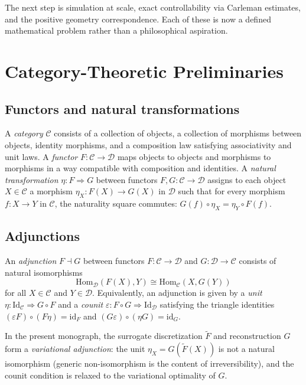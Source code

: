 \documentclass[12pt, oneside]{memoir}
\newcommand{\Ft}{\widetilde{F}}
\begin{document}
The next step is simulation at scale, exact controllability via Carleman estimates, and
the positive geometry correspondence.  Each of these is now a defined mathematical
problem rather than a philosophical aspiration.
\appendix

\chapter{Category-Theoretic Preliminaries}
\label{app:cat}

\section{Functors and natural transformations}

A \emph{category} $\mathcal{C}$ consists of a collection of objects, a collection of
morphisms between objects, identity morphisms, and a composition law satisfying
associativity and unit laws.  A \emph{functor} $F: \mathcal{C} \to \mathcal{D}$ maps
objects to objects and morphisms to morphisms in a way compatible with composition and
identities.  A \emph{natural transformation} $\eta: F \Rightarrow G$ between functors
$F, G: \mathcal{C} \to \mathcal{D}$ assigns to each object $X \in \mathcal{C}$ a
morphism $\eta_X: F(X) \to G(X)$ in $\mathcal{D}$ such that for every morphism
$f: X \to Y$ in $\mathcal{C}$, the naturality square commutes:
$G(f) \circ \eta_X = \eta_Y \circ F(f)$.

\section{Adjunctions}

An \emph{adjunction} $F \dashv G$ between functors $F: \mathcal{C} \to \mathcal{D}$ and
$G: \mathcal{D} \to \mathcal{C}$ consists of natural isomorphisms
\[
  \mathrm{Hom}_{\mathcal{D}}(F(X), Y) \cong \mathrm{Hom}_{\mathcal{C}}(X, G(Y))
\]
for all $X \in \mathcal{C}$ and $Y \in \mathcal{D}$.  Equivalently, an adjunction is
given by a \emph{unit} $\eta: \mathrm{Id}_\mathcal{C} \Rightarrow G \circ F$ and a
\emph{counit} $\varepsilon: F \circ G \Rightarrow \mathrm{Id}_\mathcal{D}$ satisfying
the triangle identities $(\varepsilon F) \circ (F\eta) = \mathrm{id}_F$ and
$(G\varepsilon) \circ (\eta G) = \mathrm{id}_G$.

In the present monograph, the surrogate discretization $\Ft$ and reconstruction $G$ form
a \emph{variational adjunction}: the unit $\eta_X = G(\Ft(X))$ is not a natural
isomorphism (generic non-isomorphism is the content of irreversibility), and the counit
condition is relaxed to the variational optimality of $G$.
\end{document}
